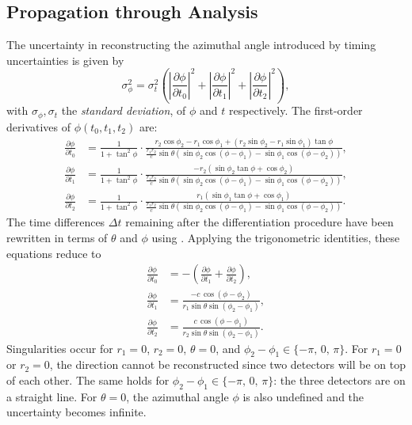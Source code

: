 \subsection{Propagation through Analysis}

The uncertainty in reconstructing the azimuthal angle introduced by timing
uncertainties is given by
\begin{equation}
\sigma_\phi^2 = \sigma_t^2 \left(\left|\frac{\partial\phi}{\partial t_0}\right|^2 + \left|\frac{\partial\phi}{\partial t_1}\right|^2 + \left|\frac{\partial\phi}{\partial t_2}\right|^2\right),
\end{equation}
with $\sigma_\phi, \sigma_t$ the \emph{standard deviation}, of
$\phi$ and $t$ respectively.  The first-order derivatives of $\phi(t_0, t_1,
t_2)$ are:
\begin{align}
\frac{\partial \phi}{\partial t_0} &= \frac{1}{1 + \tan^2\phi} \cdot \frac{r_2\cos \phi_2 - r_1\cos \phi_1 + (r_2\sin \phi_2 - r_1\sin \phi_1)\tan \phi}{\frac{r_1 r_2}{c}\sin\theta\left(\sin\phi_2\cos(\phi - \phi_1) - \sin\phi_1\cos(\phi - \phi_2)\right)} , \\[10pt]
\frac{\partial \phi}{\partial t_1} &= \frac{1}{1 + \tan^2\phi} \cdot \frac{-r_2(\sin \phi_2 \tan \phi + \cos \phi_2)}{\frac{r_1 r_2}{c}\sin\theta\left(\sin\phi_2\cos(\phi - \phi_1) - \sin\phi_1\cos(\phi - \phi_2)\right)}, \\[10pt]
\frac{\partial \phi}{\partial t_2} &= \frac{1}{1 + \tan^2\phi} \cdot
\frac{r_1(\sin \phi_1 \tan \phi + \cos \phi_1)}{\frac{r_1 r_2}{c}\sin\theta\left(\sin\phi_2\cos(\phi - \phi_1) - \sin\phi_1\cos(\phi - \phi_2)\right)}.
\end{align}
The time differences $\Delta t$ remaining after the differentiation procedure
have been rewritten in terms of $\theta$ and $\phi$ using .  Applying
the trigonometric identities, these equations reduce to
\begin{align}
\frac{\partial \phi}{\partial t_0} &= -\left( \frac{\partial \phi}{\partial t_1} + \frac{\partial \phi}{\partial t_2} \right), \\[10pt]
\frac{\partial \phi}{\partial t_1} &= \frac{-c\, \cos(\phi - \phi_2)}{r_1 \sin\theta \sin(\phi_2 - \phi_1)}, \\[10pt]
\frac{\partial \phi}{\partial t_2} &= \frac{c\, \cos(\phi - \phi_1)}{r_2 \sin\theta \sin(\phi_2 - \phi_1)}.
\end{align}
%
Singularities occur for $r_1 = 0$, $r_2 = 0$, $\theta = 0$, and $\phi_2 -
\phi_1 \in \{-\pi,\, 0,\, \pi\}$. For $r_1 = 0$ or $r_2 = 0$, the direction cannot be reconstructed
since two detectors will be on top of each other.  The same holds
for $\phi_2 - \phi_1 \in \{-\pi,\, 0,\, \pi\}$: the
three detectors are on a straight line.  For $\theta = 0$, the azimuthal angle
$\phi$ is also undefined and the uncertainty becomes infinite.


